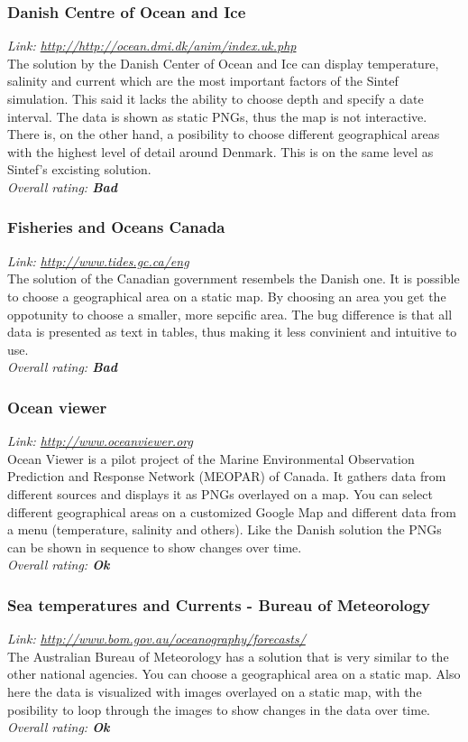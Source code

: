 \documentclass[11pt,a4paper,titlepage,oneside]{report}
\begin{document}
\subsubsection{Danish Centre of Ocean and Ice}
\emph{Link: \url{http://http://ocean.dmi.dk/anim/index.uk.php }} \\%
  The solution by the Danish Center of Ocean and Ice can display temperature, salinity and current which are the most important factors of the Sintef simulation. This said it lacks the ability to choose depth and specify a date interval. The data is shown as static PNGs, thus the map is not interactive. There is, on the other hand, a posibility to choose different geographical areas with the highest level of detail around Denmark. This is on the same level as Sintef's excisting solution.
\\ \emph{Overall rating: \textbf{Bad}}

\subsubsection{Fisheries and Oceans Canada}
\emph{Link: \url{http://www.tides.gc.ca/eng}} \\%
  The solution of the Canadian government resembels the Danish one. It is possible to choose a geographical area on a static map. By choosing an area you get the oppotunity to choose a smaller, more sepcific area. The bug difference is that all data is presented as text in tables, thus making it less convinient and intuitive to use.
\\ \emph{Overall rating: \textbf{Bad}}

\subsubsection{Ocean viewer}
\emph{Link: \url{http://www.oceanviewer.org}} \\%
  Ocean Viewer is a pilot project of the Marine Environmental Observation Prediction and Response Network (MEOPAR) of Canada. It gathers data from different sources and displays it as PNGs overlayed on a map. You can select different geographical areas on a customized Google Map and different data from a menu (temperature, salinity and others). Like the Danish solution the PNGs can be shown in sequence to show changes over time.
\\ \emph{Overall rating: \textbf{Ok}}

\subsubsection{Sea temperatures and Currents - Bureau of Meteorology}
\emph{Link: \url{http://www.bom.gov.au/oceanography/forecasts/}} \\%
  The Australian Bureau of Meteorology has a solution that is very similar to the other national agencies. You can choose a geographical area on a static map. Also here the data is visualized with images overlayed on a static map, with the posibility to loop through the images to show changes in the data over time.
\\ \emph{Overall rating: \textbf{Ok}}
\end{document}
